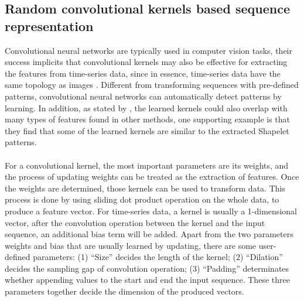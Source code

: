 \subsection{Random convolutional kernels based sequence representation}
Convolutional neural networks are typically used in computer vision tasks, their success implicits that convolutional kernels may also be effective for extracting the features from time-series data, since in essence, time-series data have the same topology as images \cite{fawaz2020inceptiontime}. Different from transforming sequences with pre-defined patterns, convolutional neural networks can automatically detect patterns by learning. In addition, as stated by \cite{dempster2020rocket}, the learned kernels could also overlap with many types of features found in other methods, one supporting example is that they find that some of the learned kernels are similar to the extracted Shapelet patterns.\\
\\For a convolutional kernel, the most important parameters are its weights, and the process of updating weights can be treated as the extraction of features. Once the weights are determined, those kernels can be used to transform data. This process is done by using sliding dot product operation on the whole data, to produce a feature vector. For time-series data, a kernel is usually a 1-dimensional vector, after the convolution operation between the kernel and the input sequence, an additional bias term will be added. Apart from the two parameters weights and bias that are usually learned by updating, there are some user-defined parameters: (1) ``Size'' decides the length of the kernel; (2) ``Dilation'' decides the sampling gap of convolution operation; (3) ``Padding'' determinates whether appending values to the start and end the input sequence. These three parameters together decide the dimension of the produced vectors. \\
